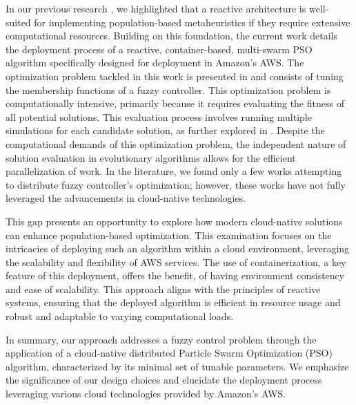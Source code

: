 \documentclass{cys}
\begin{document}
In our previous research \cite{merelo2019scaling}, we highlighted that a 
reactive architecture is well-suited for implementing population-based metaheuristics if they require 
extensive computational resources. Building on this foundation, the current work details the 
deployment process of a reactive, container-based, multi-swarm PSO algorithm
specifically designed for deployment in Amazon's AWS. %
The optimization problem tackled in this work is presented in \cite{mancilla2021optimization} 
and consists of tuning the membership functions of a fuzzy controller. This 
optimization problem is computationally intensive, primarily because it requires 
evaluating the fitness of all potential solutions.
This evaluation process involves running multiple simulations for each candidate 
solution, as further explored in \cite{mancilla2022tracking,mancilla2022optimal}. 
Despite the computational demands of this optimization problem, the independent 
nature of solution evaluation in evolutionary algorithms allows for the efficient parallelization of work.
In the literature, we found only a few works \cite{cortes2014optimal,oh2009design,ciurea2013determining}
attempting to distribute fuzzy controller's optimization; however, these works
have not fully leveraged the advancements in cloud-native technologies. %

This gap presents an opportunity to explore how modern cloud-native solutions can 
enhance population-based optimization. This examination focuses on the intricacies of 
deploying such an algorithm within a cloud environment, leveraging the scalability and 
flexibility of AWS services. The use of containerization, a key feature of this deployment, 
offers the benefit, of having environment consistency and ease of scalability. This 
approach aligns with the principles of reactive systems, ensuring that the deployed 
algorithm is efficient in resource usage and robust and adaptable to varying
computational loads. %

In summary, our approach addresses a fuzzy control problem through the application
of a cloud-native distributed Particle Swarm Optimization (PSO) algorithm, characterized 
by its minimal set of tunable parameters. We emphasize the significance of our design 
choices and elucidate the deployment process leveraging various cloud technologies 
provided by Amazon's AWS.
\end{document}
